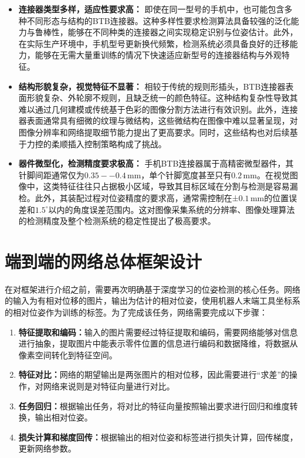 \documentclass{Diploma}
\begin{document}
\begin{itemize}
\item \textbf{连接器类型多样，适应性要求高：} 即使在同一型号的手机中，也可能包含多种不同形态与结构的BTB连接器。这种多样性要求检测算法具备较强的泛化能力与鲁棒性，能够在不同种类的连接器之间实现稳定识别与位姿估计。此外，在实际生产环境中，手机型号更新换代频繁，检测系统必须具备良好的迁移能力，能够在无需大量重训练的情况下快速适应新型号的连接器结构与外观特征。
\item \textbf{结构形貌复杂，视觉特征不显著：} 相较于传统的规则形插头，BTB连接器表面形貌复杂、外轮廓不规则，且缺乏统一的颜色特征。这种结构复杂性导致其难以通过几何建模或传统基于色彩的图像分割方法进行有效识别。此外，连接器表面通常具有细微的纹理与微结构，这些微结构在图像中难以显著呈现，对图像分辨率和网络提取细节能力提出了更高要求。同时，这些结构也对后续基于力控的柔顺插入控制策略构成了挑战。
\item \textbf{器件微型化，检测精度要求极高：} 手机BTB连接器属于高精密微型器件，其针脚间距通常仅为$0.35--0.4\,\mathrm{mm}$，单个针脚宽度甚至只有$0.2\,\mathrm{mm}$。在视觉图像中，这类特征往往只占据极小区域，导致其目标区域在分割与检测是容易漏检。此外，其装配过程对位姿精度的要求高，通常需控制在±$0.1\,\mathrm{mm}$的位置误差和$1.5^{\circ}$以内的角度误差范围内。这对图像采集系统的分辨率、图像处理算法的检测精度及整个检测系统的稳定性提出了极高要求。
\end{itemize}
\section{端到端的网络总体框架设计}
在对框架进行介绍之前，需要再次明确基于深度学习的位姿检测的核心任务。网络的输入为有相对位移的图片，输出为估计的相对位姿，使用机器人末端工具坐标系的相对位姿作为训练的标签。为了完成该任务，网络需要完成以下步骤：

\begin{enumerate}
  \item \textbf{特征提取和编码：}输入的图片需要经过特征提取和编码，需要网络能够对信息进行抽象，提取图片中能表示零件位置的信息进行编码和数据降维，将数据从像素空间转化到特征空间。
  \item \textbf{特征对比：}网络的期望输出是两张图片的相对位移，因此需要进行“求差”的操作，对网络来说则是对特征向量进行对比。
  \item \textbf{任务回归：}根据输出任务，将对比的特征向量按照输出要求进行回归和维度转换，输出相对位姿。
  \item \textbf{损失计算和梯度回传：}根据输出的相对位姿和标签进行损失计算，回传梯度，更新网络参数。
\end{enumerate}
\end{document}
